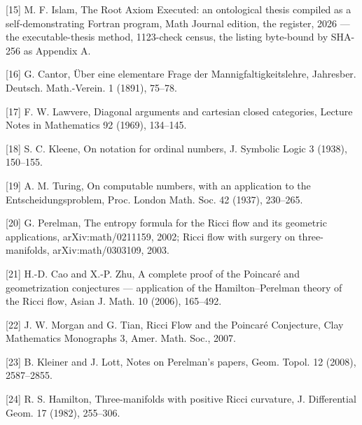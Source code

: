 \documentclass[10pt,twocolumn]{article}
\begin{document}
{[}15{]} M. F. Islam, The Root Axiom Executed: an ontological thesis
compiled as a self-demonstrating Fortran program, Math Journal edition,
the register, 2026 --- the executable-thesis method, 1123-check census,
the listing byte-bound by SHA-256 as Appendix A.

{[}16{]} G. Cantor, Über eine elementare Frage der
Mannigfaltigkeitslehre, Jahresber. Deutsch. Math.-Verein. 1 (1891),
75--78.

{[}17{]} F. W. Lawvere, Diagonal arguments and cartesian closed
categories, Lecture Notes in Mathematics 92 (1969), 134--145.

{[}18{]} S. C. Kleene, On notation for ordinal numbers, J. Symbolic
Logic 3 (1938), 150--155.

{[}19{]} A. M. Turing, On computable numbers, with an application to the
Entscheidungsproblem, Proc. London Math. Soc. 42 (1937), 230--265.

{[}20{]} G. Perelman, The entropy formula for the Ricci flow and its
geometric applications, arXiv:math/0211159, 2002; Ricci flow with
surgery on three-manifolds, arXiv:math/0303109, 2003.

{[}21{]} H.-D. Cao and X.-P. Zhu, A complete proof of the Poincaré and
geometrization conjectures --- application of the Hamilton--Perelman
theory of the Ricci flow, Asian J. Math. 10 (2006), 165--492.

{[}22{]} J. W. Morgan and G. Tian, Ricci Flow and the Poincaré
Conjecture, Clay Mathematics Monographs 3, Amer. Math. Soc., 2007.

{[}23{]} B. Kleiner and J. Lott, Notes on Perelman's papers, Geom.
Topol. 12 (2008), 2587--2855.

{[}24{]} R. S. Hamilton, Three-manifolds with positive Ricci curvature,
J. Differential Geom. 17 (1982), 255--306.
\end{document}
